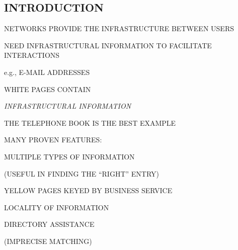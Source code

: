 \begin{bwslide}
\part*	{INTRODUCTION}\bf

\begin{nrtc}
\item	NETWORKS PROVIDE THE INFRASTRUCTURE BETWEEN USERS

\item	NEED INFRASTRUCTURAL INFORMATION TO FACILITATE INTERACTIONS
    \begin{nrtc}
    \item	e.g., E-MAIL ADDRESSES
    \end{nrtc}

\item	WHITE PAGES CONTAIN 
    \begin{nrtc}
    \item	\emph{INFRASTRUCTURAL INFORMATION}
    \end{nrtc}
\end{nrtc}
\end{bwslide}


\begin{bwslide}

\begin{nrtc}
\item	THE TELEPHONE BOOK IS THE BEST EXAMPLE

\item	MANY PROVEN FEATURES:
    \begin{nrtc}
    \item	MULTIPLE TYPES OF INFORMATION 
	\begin{nrtc}
	\item	(USEFUL IN FINDING THE ``RIGHT'' ENTRY)
	\end{nrtc}

    \item	YELLOW PAGES KEYED BY BUSINESS SERVICE

    \item	LOCALITY OF INFORMATION

    \item	DIRECTORY ASSISTANCE
	\begin{nrtc}
	\item	(IMPRECISE MATCHING)
	\end{nrtc}
    \end{nrtc}
\end{nrtc}
\end{bwslide}



